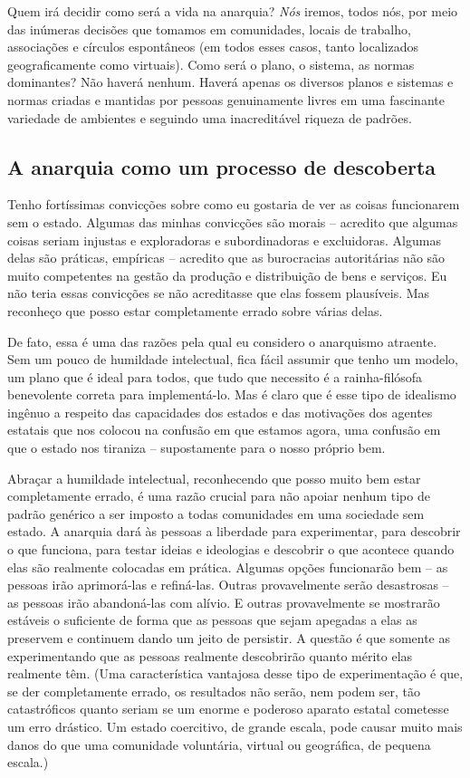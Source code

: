 Quem irá decidir como será a vida na anarquia? \emph{Nós} iremos, todos nós, por meio das inúmeras decisões que tomamos em comunidades, locais de trabalho, associações e círculos espontâneos (em todos esses casos, tanto localizados geograficamente como virtuais). Como será o plano, o sistema, as normas dominantes? Não haverá nenhum. Haverá apenas os diversos planos e sistemas e normas criadas e mantidas por pessoas genuinamente livres em uma fascinante variedade de ambientes e seguindo uma inacreditável riqueza de padrões.

\subsection*{A anarquia como um processo de descoberta}

Tenho fortíssimas convicções sobre como eu gostaria de ver as coisas funcionarem sem o estado. Algumas das minhas convicções são morais -- acredito que algumas coisas seriam injustas e exploradoras e subordinadoras e excluidoras. Algumas delas são práticas, empíricas -- acredito que as burocracias autoritárias não são muito competentes na gestão da produção e distribuição de bens e serviços. Eu não teria essas convicções se não acreditasse que elas fossem plausíveis. Mas reconheço que posso estar completamente errado sobre várias delas.

De fato, essa é uma das razões pela qual eu considero o anarquismo atraente. Sem um pouco de humildade intelectual, fica fácil assumir que tenho um modelo, um plano que é ideal para todos, que tudo que necessito é a rainha-filósofa benevolente correta para implementá-lo. Mas é claro que é esse tipo de idealismo ingênuo a respeito das capacidades dos estados e das motivações dos agentes estatais que nos colocou na confusão em que estamos agora, uma confusão em que o estado nos tiraniza -- supostamente para o nosso próprio bem.

Abraçar a humildade intelectual, reconhecendo que posso muito bem estar completamente errado, é uma razão crucial para não apoiar nenhum tipo de padrão genérico a ser imposto a todas comunidades em uma sociedade sem estado. A anarquia dará às pessoas a liberdade para experimentar, para descobrir o que funciona, para testar ideias e ideologias e descobrir o que acontece quando elas são realmente colocadas em prática. Algumas opções funcionarão bem -- as pessoas irão aprimorá-las e refiná-las. Outras provavelmente serão desastrosas -- as pessoas irão abandoná-las com alívio. E outras provavelmente se mostrarão estáveis o suficiente de forma que as pessoas que sejam apegadas a elas as preservem e continuem dando um jeito de persistir. A questão é que somente as experimentando que as pessoas realmente descobrirão quanto mérito elas realmente têm. (Uma característica vantajosa desse tipo de experimentação é que, se der completamente errado, os resultados não serão, nem podem ser, tão catastróficos quanto seriam se um enorme e poderoso aparato estatal cometesse um erro drástico. Um estado coercitivo, de grande escala, pode causar muito mais danos do que uma comunidade voluntária, virtual ou geográfica, de pequena escala.)


